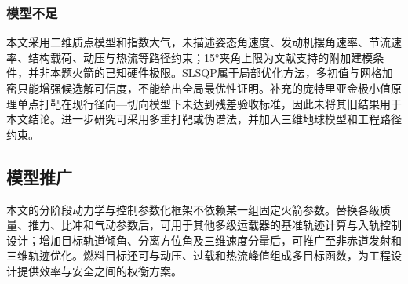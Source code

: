\documentclass{JXUSTmodeling}
\begin{document}
\subsubsection{模型不足}
本文采用二维质点模型和指数大气，未描述姿态角速度、发动机摆角速率、节流速率、结构载荷、动压与热流等路径约束；15°夹角上限为文献支持的附加建模条件，并非本题火箭的已知硬件极限。SLSQP属于局部优化方法，多初值与网格加密只能增强候选解可信度，不能给出全局最优性证明。补充的庞特里亚金极小值原理单点打靶在现行径向—切向模型下未达到残差验收标准，因此未将其旧结果用于本文结论。进一步研究可采用多重打靶或伪谱法，并加入三维地球模型和工程路径约束。
\subsection{模型推广}
本文的分阶段动力学与控制参数化框架不依赖某一组固定火箭参数。替换各级质量、推力、比冲和气动参数后，可用于其他多级运载器的基准轨迹计算与入轨控制设计；增加目标轨道倾角、分离方位角及三维速度分量后，可推广至非赤道发射和三维轨迹优化。燃料目标还可与动压、过载和热流峰值组成多目标函数，为工程设计提供效率与安全之间的权衡方案。
\end{document}

